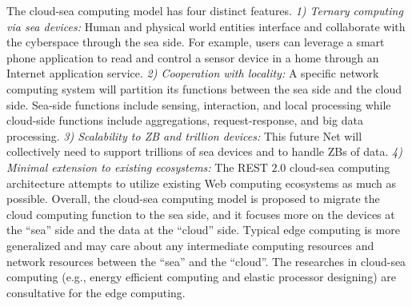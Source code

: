 The cloud-sea computing model has four distinct features. 
\textit{1) Ternary computing via sea devices:} 
Human and physical world entities interface and collaborate with the cyberspace through the sea side. For example, users can leverage a smart phone application to read and control a sensor device in a home through an Internet application service.
\textit{2) Cooperation with locality:} 
A specific network computing system will partition its functions between the sea side and the cloud side. Sea-side functions include sensing, interaction, and local processing while cloud-side functions include aggregations, request-response, and big data processing.
\textit{3) Scalability to ZB and trillion devices:} 
This future Net will collectively need to support trillions of sea devices and to handle ZBs of data.
\textit{4) Minimal extension to existing ecosystems:} 
The REST $2.0$ cloud-sea computing architecture attempts to utilize existing Web computing ecosystems as much as possible. 
Overall, the cloud-sea computing model is proposed to migrate the cloud computing function to the sea side, and it focuses more on the devices at the ``sea'' side and the data at the ``cloud'' side. Typical edge computing is more generalized and may care about any intermediate computing resources and network resources between the ``sea'' and the ``cloud''. The researches in cloud-sea computing (e.g., energy efficient computing and elastic processor designing) are consultative for the edge computing.


